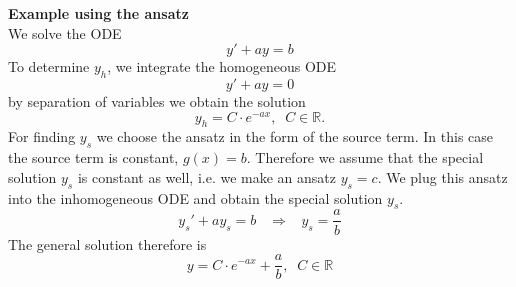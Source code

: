 \textbf{Example using the ansatz}\\
We solve the ODE
\begin{equation}
  y' + ay = b
\end{equation}
To determine $y_h$, we integrate the homogeneous ODE
\begin{equation}
  y' + ay = 0
\end{equation}
by separation of variables we obtain the solution
\begin{equation}
  y_h = C \cdot e^{-ax}, \;\; C \in \mathbb{R}.
\end{equation}
For finding $y_s$ we choose the ansatz in the form of the source term. In this case the source term is constant, $g(x) = b$. Therefore we assume that the special solution $y_s$ is constant as well, i.e. we make an ansatz $y_s = c$. We plug this ansatz into the inhomogeneous ODE and obtain the special solution $y_s$.
\begin{equation}
  y_s'+ay_s = b \;\;\; \Rightarrow \;\;\; y_s = \frac{a}{b}
\end{equation}
The general solution therefore is
\begin{equation}
  y = C \cdot e^{-ax} + \frac{a}{b}, \;\; C \in \mathbb{R}
\end{equation}


